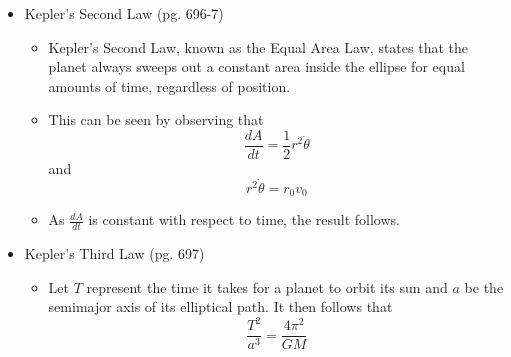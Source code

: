\documentclass[12pt]{article}
\newcommand{\<}{\left<}
\renewcommand{\>}{\right>}
\begin{document}
\begin{itemize}
  \item Kepler's Second Law (pg. 696-7)
  
    \begin{itemize}
    \item Kepler's Second Law, known as the Equal Area Law, states that the planet always sweeps out a constant area inside the ellipse for equal amounts of time, regardless of position.
    \item This can be seen by observing that \[\frac{dA}{dt} = \frac{1}{2}r^2\dot\theta\] and \[r^2\dot\theta = r_0v_0\]
    \item As $\frac{dA}{dt}$ is constant with respect to time, the result follows.
    \end{itemize}
    
  \item Kepler's Third Law (pg. 697)
  
    \begin{itemize}
    \item Let $T$ represent the time it takes for a planet to orbit its sun and $a$ be the semimajor axis of its elliptical path. It then follows that \[\frac{T^2}{a^3}=\frac{4\pi^2}{GM}\]
    \end{itemize}
    
  \end{itemize}
  
  \newpage
  
  
  
\end{document}
